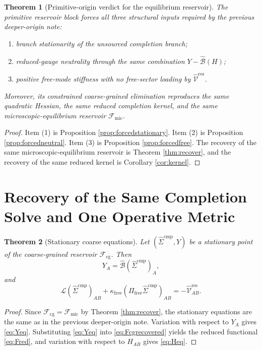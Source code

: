 \documentclass[11pt]{article}
\newcommand{\CompLift}{\widehat\Sigma^{\mathrm{cmp}}}
\newcommand{\ResidualLift}{\widehat{\mathcal V}^{\mathrm{res}}}
\newcommand{\SubGaugeVec}{\widehat{\mathcal B}}
\newcommand{\SubReducedEin}{\widehat{\mathcal L}}
\newcommand{\FreeProj}{\Pi_{\mathrm{free}}}
\newcommand{\GaugeAux}{Y}
\newcommand{\MicFunctional}{\mathscr F_{\mathrm{mic}}}
\newcommand{\CoarseFunctional}{\mathscr F_{\mathrm{cg}}}
\newcommand{\FreeStiff}{\kappa_{\mathrm{free}}}
\newtheorem{theorem}{Theorem}
\begin{document}
\begin{theorem}[Primitive-origin verdict for the equilibrium reservoir]
\label{thm:primitiveverdict}
The primitive reservoir block forces all three structural inputs required by the previous deeper-origin note:
\begin{enumerate}
    \item branch stationarity of the unsourced completion branch;
    \item reduced-gauge neutrality through the same combination \(\GaugeAux-\SubGaugeVec(H)\);
    \item positive free-mode stiffness with no free-sector loading by \(\ResidualLift\).
\end{enumerate}
Moreover, its constrained coarse-grained elimination reproduces the same quadratic Hessian, the same reduced completion kernel, and the same microscopic-equilibrium reservoir \(\MicFunctional\).
\end{theorem}

\begin{proof}
Item (1) is Proposition \ref{prop:forcedstationary}. Item (2) is Proposition \ref{prop:forcedneutral}. Item (3) is Proposition \ref{prop:forcedfree}. The recovery of the same microscopic-equilibrium reservoir is Theorem \ref{thm:recover}, and the recovery of the same reduced kernel is Corollary \ref{cor:kernel}.
\end{proof}

\section{Recovery of the Same Completion Solve and One Operative Metric}

\begin{theorem}[Stationary coarse equations]
\label{thm:stationary}
Let \((\CompLift,\GaugeAux)\) be a stationary point of the coarse-grained reservoir \(\CoarseFunctional\). Then
\begin{equation}
\GaugeAux_A=\SubGaugeVec(\CompLift)_A,
\label{eq:Yeq}
\end{equation}
and
\begin{equation}
\SubReducedEin(\CompLift)_{AB}
+\FreeStiff(\FreeProj\CompLift)_{AB}
=
-\ResidualLift_{AB}.
\label{eq:Heq}
\end{equation}
\end{theorem}

\begin{proof}
Since \(\CoarseFunctional=\MicFunctional\) by Theorem \ref{thm:recover}, the stationary equations are the same as in the previous deeper-origin note. Variation with respect to \(\GaugeAux_A\) gives \eqref{eq:Yeq}. Substituting \eqref{eq:Yeq} into \eqref{eq:Fcgrecovered} yields the reduced functional \eqref{eq:Fred}, and variation with respect to \(H_{AB}\) gives \eqref{eq:Heq}.
\end{proof}
\end{document}
